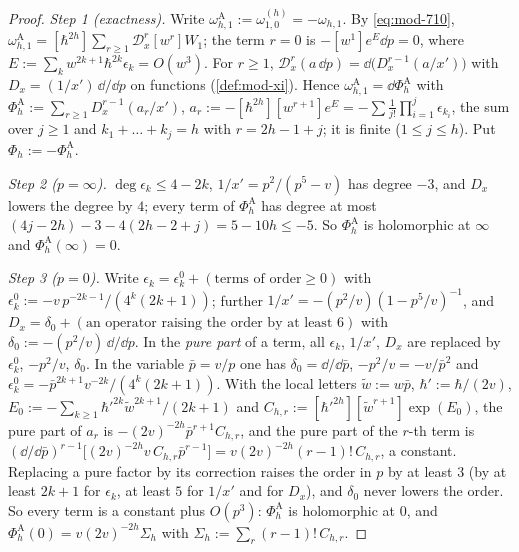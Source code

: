 \begin{proof}
\emph{Step 1 (exactness).} Write $\omega^{\mathrm A}_{h,1}:=\omega^{(h)}_{1,0}=-\omega_{h,1}$. By \eqref{eq:mod-710}, $\omega^{\mathrm A}_{h,1}=[\hbar^{2h}]\sum_{r\geq 1}\mathcal D_x^r[w^r]W_1$; the term $r=0$ is $-[w^1]e^{E}\dd p=0$, where $E:=\sum_kw^{2k+1}\hbar^{2k}\epsilon_k=O(w^3)$. For $r\geq 1$, $\mathcal D_x^r(a\,\dd p)=\dd\big(D_x^{r-1}(a/x')\big)$ with $D_x=(1/x')\,\dd/\dd p$ on functions (\cref{def:mod-xi}). Hence $\omega^{\mathrm A}_{h,1}=\dd\Phi^{\mathrm A}_h$ with $\Phi^{\mathrm A}_h:=\sum_{r\geq 1}D_x^{r-1}(a_r/x')$, $a_r:=-[\hbar^{2h}][w^{r+1}]e^{E}=-\sum\frac1{j!}\prod_{i=1}^j\epsilon_{k_i}$, the sum over $j\geq 1$ and $k_1+\dots+k_j=h$ with $r=2h-1+j$; it is finite ($1\leq j\leq h$). Put $\Phi_h:=-\Phi^{\mathrm A}_h$.

\emph{Step 2 ($p=\infty$).} $\deg\epsilon_k\leq 4-2k$, $1/x'=p^2/(p^5-v)$ has degree $-3$, and $D_x$ lowers the degree by $4$; every term of $\Phi^{\mathrm A}_h$ has degree at most $(4j-2h)-3-4(2h-2+j)=5-10h\leq -5$. So $\Phi^{\mathrm A}_h$ is holomorphic at $\infty$ and $\Phi^{\mathrm A}_h(\infty)=0$.

\emph{Step 3 ($p=0$).} Write $\epsilon_k=\epsilon^0_k+(\text{terms of order}\geq 0)$ with $\epsilon^0_k:=-v\,p^{-2k-1}/(4^k(2k+1))$; further $1/x'=-(p^2/v)(1-p^5/v)^{-1}$, and $D_x=\delta_0+(\text{an operator raising the order by at least }6)$ with $\delta_0:=-(p^2/v)\,\dd/\dd p$. In the \emph{pure part} of a term, all $\epsilon_k$, $1/x'$, $D_x$ are replaced by $\epsilon^0_k$, $-p^2/v$, $\delta_0$. In the variable $\bar p=v/p$ one has $\delta_0=\dd/\dd\bar p$, $-p^2/v=-v/\bar p^2$ and $\epsilon^0_k=-\bar p^{2k+1}v^{-2k}/(4^k(2k+1))$. With the local letters $\tilde w:=w\bar p$, $\hbar':=\hbar/(2v)$, $E_0:=-\sum_{k\geq 1}\hbar'^{2k}\tilde w^{2k+1}/(2k+1)$ and $C_{h,r}:=[\hbar'^{2h}][\tilde w^{r+1}]\exp(E_0)$, the pure part of $a_r$ is $-(2v)^{-2h}\bar p^{r+1}C_{h,r}$, and the pure part of the $r$-th term is $(\dd/\dd\bar p)^{r-1}\big[(2v)^{-2h}v\,C_{h,r}\bar p^{r-1}\big]=v(2v)^{-2h}(r-1)!\,C_{h,r}$, a constant. Replacing a pure factor by its correction raises the order in $p$ by at least $3$ (by at least $2k+1$ for $\epsilon_k$, at least $5$ for $1/x'$ and for $D_x$), and $\delta_0$ never lowers the order. So every term is a constant plus $O(p^3)$: $\Phi^{\mathrm A}_h$ is holomorphic at $0$, and $\Phi^{\mathrm A}_h(0)=v(2v)^{-2h}\Sigma_h$ with $\Sigma_h:=\sum_r(r-1)!\,C_{h,r}$.


\end{proof}
